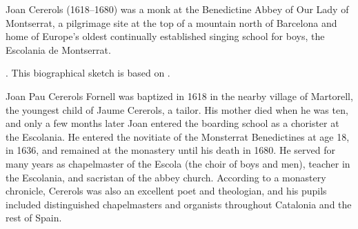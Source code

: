 

\begin{notesources}

\begin{source}
\end{source}

\begin{source}
\end{source}

\begin{source}
\end{source}

\end{notesources}

Joan Cererols (1618--1680) was a monk at the Benedictine Abbey of Our Lady of
Montserrat, a pilgrimage site at the top of a mountain north of Barcelona and
home of Europe's oldest continually established singing school for boys, the
Escolania de Montserrat.%
\begin{Footnote}
    \Autocite[227--284]{Cashner:PhD}.
    This biographical sketch is based on 
    \autocites{Estrada:CererolsBio}{Balanza:CererolsFamily}.
\end{Footnote}
Joan Pau Cererols Fornell was baptized in 1618 in the nearby village of
Martorell, the youngest child of Jaume Cererols, a tailor.
His mother died when he was ten, and only a few months later Joan entered the
boarding school as a chorister at the Escolania.
He entered the novitiate of the Monsterrat Benedictines at age 18, in 1636, and
remained at the monastery until his death in 1680.
He served for many years as chapelmaster of the Escola (the choir of boys and
men), teacher in the Escolania, and sacristan of the abbey church.
According to a monastery chronicle, Cererols was also an excellent poet and
theologian, and his pupils included distinguished chapelmasters and organists
throughout Catalonia and the rest of Spain.


